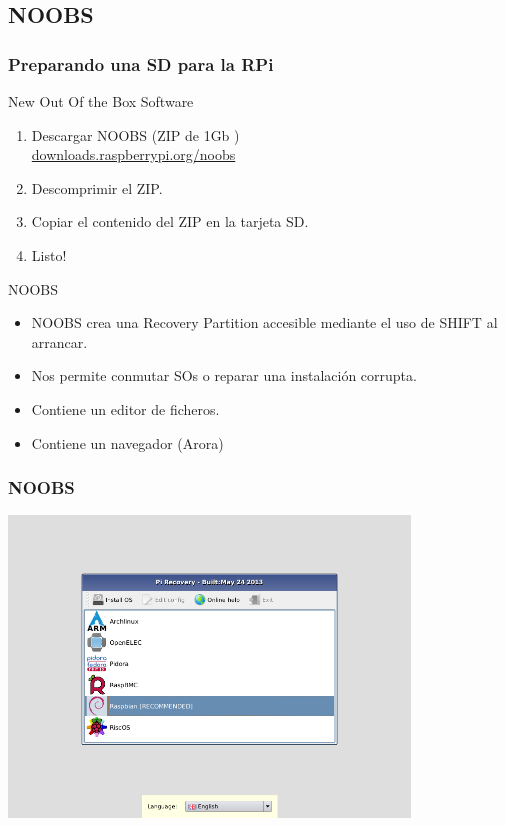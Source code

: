 \documentclass[10pt,colorlinks]{beamer}
\begin{document}
\subsection{NOOBS}
\begin{frame}[fragile]\frametitle{Preparando una SD para la RPi}
\begin{block}{New Out Of the Box Software}

\begin{enumerate}
    \item Descargar NOOBS (ZIP de 1Gb )\\
     \href{downloads.raspberrypi.org/noobs}{downloads.raspberrypi.org/noobs}
    \item Descomprimir el ZIP. 
    \item Copiar el contenido del ZIP en la tarjeta SD. 
    \item Listo!
\end{enumerate}

\end{block}

\begin{block}{NOOBS}
\begin{itemize}
    \item NOOBS crea una Recovery Partition accesible mediante el uso de SHIFT al arrancar. 
    \item Nos permite conmutar SOs o reparar una instalación corrupta.
    \item Contiene un editor de ficheros. 
    \item Contiene un navegador (Arora)
\end{itemize}
\end{block}

\end{frame}


\begin{frame}[fragile]\frametitle{NOOBS}
\includegraphics[width=0.8\textwidth]{figs/noobs1}
\end{frame}
\end{document}
